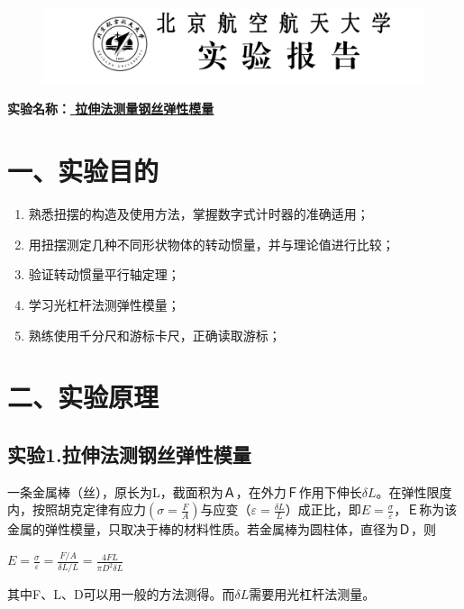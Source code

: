 \documentclass[11pt,a4paper,oneside]{article}
\begin{document}
\begin{figure}[H]
 \centering
  \includegraphics[width=13cm]{Image/表头.png}
\end{figure}
\begin{center}
\textbf{{\large 实验名称：\uline{          拉伸法测量钢丝弹性模量       }}}
\end{center}


\section*{一、实验目的}
\begin{enumerate}
\item 熟悉扭摆的构造及使用方法，掌握数字式计时器的准确适用；
\item 用扭摆测定几种不同形状物体的转动惯量，并与理论值进行比较；
\item 验证转动惯量平行轴定理；
\item 学习光杠杆法测弹性模量；
\item 熟练使用千分尺和游标卡尺，正确读取游标；
\end{enumerate}

\section*{二、实验原理}
\subsection*{实验1.拉伸法测钢丝弹性模量}
一条金属棒（丝），原长为L，截面积为Ａ，在外力Ｆ作用下伸长$\delta L$。在弹性限度内，按照胡克定律有应力$(\sigma =\displaystyle\frac{F}{A})$与应变$（\varepsilon =\displaystyle\frac{\delta L}{L}）$成正比，即$E=\displaystyle\frac{\sigma }{\varepsilon }$，Ｅ称为该金属的弹性模量，只取决于棒的材料性质。若金属棒为圆柱体，直径为Ｄ，则
\begin{center}
$　E=\displaystyle\frac{\sigma }{\varepsilon }=\displaystyle\frac{F/A}{\delta L/L}=\displaystyle\frac{4FL}{\pi D^{2}\delta L}$
\end{center}
其中F、L、D可以用一般的方法测得。而$\delta L$需要用光杠杆法测量。
\end{document}
